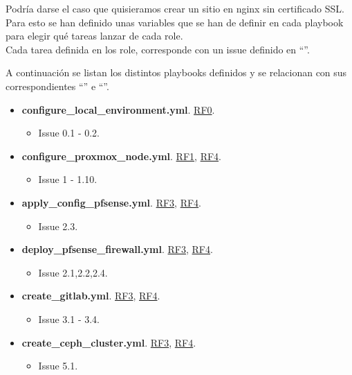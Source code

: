 \begin{text}
\begin{text}
	Podría darse el caso que quisieramos crear un sitio en nginx sin certificado SSL. Para esto se han definido unas variables que se han de definir en cada playbook para elegir qué tareas lanzar de cada role. \\
	Cada tarea definida en los role, corresponde con un issue definido en ``''.
	
	\clearpage
	
	A continuación se listan los distintos playbooks definidos y se relacionan con sus correspondientes ``'' e ``''.
	
	\begin{itemize}
		\item \textbf{configure\_local\_environment.yml}. \hyperref[RF0]{RF0}.
		\begin{itemize}
			\item Issue 0.1 - 0.2.
		\end{itemize}
	
		\item \textbf{configure\_proxmox\_node.yml}. \hyperref[RF1]{RF1}, \hyperref[RF4]{RF4}.
		\begin{itemize}
			\item Issue 1 - 1.10.
		\end{itemize}
	
		\item \textbf{apply\_config\_pfsense.yml}. \hyperref[RF3]{RF3}, \hyperref[RF4]{RF4}.
		\begin{itemize}
			\item Issue 2.3.
		\end{itemize}
	
		\item \textbf{deploy\_pfsense\_firewall.yml}. \hyperref[RF3]{RF3}, \hyperref[RF4]{RF4}.
		\begin{itemize}
			\item Issue 2.1,2.2,2.4.
		\end{itemize}
		
		\item \textbf{create\_gitlab.yml}. \hyperref[RF3]{RF3}, \hyperref[RF4]{RF4}.
		\begin{itemize}
			\item Issue 3.1 - 3.4.
		\end{itemize}
	
		\item \textbf{create\_ceph\_cluster.yml}. \hyperref[RF3]{RF3}, \hyperref[RF4]{RF4}.
		\begin{itemize}
			\item Issue 5.1.
		\end{itemize}
	

\end{itemize}
\end{text}
\end{text}

